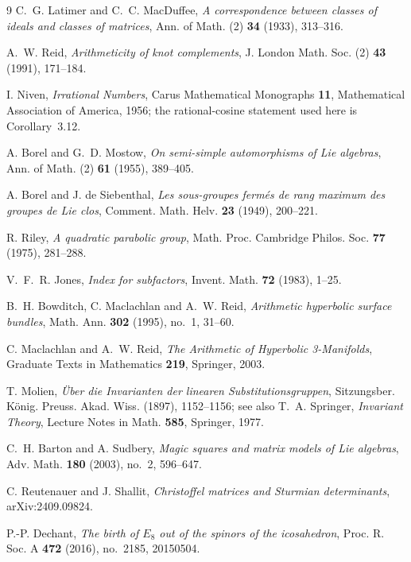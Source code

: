 \documentclass[11pt,reqno]{amsart}
\theoremstyle{plain}
\theoremstyle{definition}
\theoremstyle{remark}
\begin{document}
\begin{thebibliography}{9}
 C.~G. Latimer and C.~C. MacDuffee, \emph{A correspondence
  between classes of ideals and classes of matrices}, Ann. of Math. (2) \textbf{34}
  (1933), 313--316.

 A.~W. Reid, \emph{Arithmeticity of knot complements},
  J. London Math. Soc. (2) \textbf{43} (1991), 171--184.

 I. Niven, \emph{Irrational Numbers}, Carus Mathematical Monographs
  \textbf{11}, Mathematical Association of America, 1956; the rational-cosine statement
  used here is Corollary~3.12.

 A. Borel and G.~D. Mostow, \emph{On semi-simple automorphisms of
  Lie algebras}, Ann. of Math. (2) \textbf{61} (1955), 389--405.

 A. Borel and J. de Siebenthal, \emph{Les sous-groupes ferm\'es de rang
  maximum des groupes de Lie clos}, Comment. Math. Helv. \textbf{23} (1949), 200--221.

 R. Riley, \emph{A quadratic parabolic group}, Math. Proc. Cambridge
  Philos. Soc. \textbf{77} (1975), 281--288.

 V.~F.~R. Jones, \emph{Index for subfactors}, Invent. Math. \textbf{72}
(1983), 1--25.

 B.~H. Bowditch, C. Maclachlan and A.~W. Reid, \emph{Arithmetic
  hyperbolic surface bundles}, Math. Ann. \textbf{302} (1995), no.~1, 31--60.

 C. Maclachlan and A.~W. Reid, \emph{The Arithmetic of
Hyperbolic 3-Manifolds}, Graduate Texts in Mathematics \textbf{219}, Springer, 2003.

 T. Molien, \emph{\"Uber die Invarianten der linearen
Substitutionsgruppen}, Sitzungsber. K\"onig. Preuss. Akad. Wiss. (1897), 1152--1156;
see also T.~A. Springer, \emph{Invariant Theory}, Lecture Notes in Math. \textbf{585},
Springer, 1977.

 C.~H. Barton and A. Sudbery, \emph{Magic squares and matrix
models of Lie algebras}, Adv. Math. \textbf{180} (2003), no.~2, 596--647.

 C. Reutenauer and J. Shallit, \emph{Christoffel matrices
and Sturmian determinants}, arXiv:2409.09824.

 P.-P. Dechant, \emph{The birth of $E_8$ out of the spinors of the
icosahedron}, Proc. R. Soc. A \textbf{472} (2016), no.~2185, 20150504.


\end{thebibliography}
\end{document}
